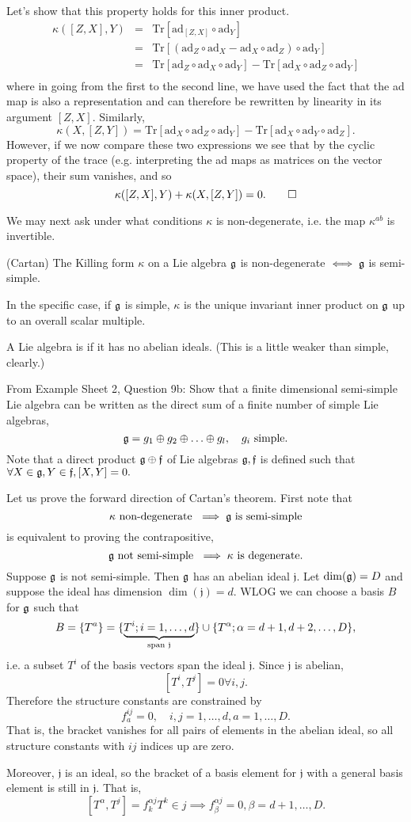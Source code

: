 Let's show that this property holds for this inner product.
\begin{eqnarray*}
\kappa([Z,X],Y) &=&\text{Tr}[\text{ad}_{[Z,X]}\circ \text{ad}_Y]\\
&=&\text{Tr}[(\text{ad}_Z \circ \text{ad}_X - \text{ad}_X \circ \text{ad}_Z)\circ \text{ad}_Y]\\
&=&\text{Tr}[\text{ad}_Z \circ \text{ad}_X \circ \text{ad}_Y] - \text{Tr}[\text{ad}_X \circ \text{ad}_Z \circ \text{ad}_Y]\\
\end{eqnarray*}
where in going from the first to the second line, we have used the fact that the ad map is also a representation and can therefore be rewritten by linearity in its argument $[Z,X]$.
Similarly,
$$\kappa(X,[Z,Y])=\text{Tr}[\text{ad}_X\circ \text{ad}_Z \circ \text{ad}_Y]-\text{Tr}[\text{ad}_X \circ \text{ad}_Y \circ \text{ad}_Z].$$
However, if we now compare these two expressions we see that by the cyclic property of the trace (e.g. interpreting the ad maps as matrices on the vector space), their sum vanishes, and so
$$\kappa([Z,X],Y)+\kappa(X,[Z,Y])=0. \qed$$

We may next ask under what conditions $\kappa$ is non-degenerate, i.e. the map $\kappa^{ab}$ is invertible. 
\begin{thm}
(Cartan) The Killing form $\kappa$ on a Lie algebra $\mathfrak{g}$ is non-degenerate $\iff \mathfrak{g}$ is semi-simple.
\end{thm}
In the specific case, if $\mathfrak{g}$ is simple, $\kappa$ is the unique invariant inner product on $\mathfrak{g}$ up to an overall scalar multiple.
\begin{defn}
A Lie algebra is  if it has no abelian ideals. (This is a little weaker than simple, clearly.)
\end{defn}
\begin{ex}
From Example Sheet 2, Question 9b: Show that a finite dimensional semi-simple Lie algebra can be written as the direct sum of a finite number of simple Lie algebras,
$$\mathfrak{g} = g_1\oplus g_2 \oplus \ldots \oplus g_l, \quad g_i\text{ simple}.$$
Note that a direct product $\mathfrak{g} \oplus \mathfrak{f}$ of Lie algebras $\mathfrak{g},\mathfrak{f}$ is defined such that $\forall X\in \mathfrak{g}, Y \in \mathfrak{f}, [X,Y]=0.$
\end{ex}

Let us prove the forward direction of Cartan's theorem. First note that $$\kappa\text{ non-degenerate }\implies \mathfrak{g}\text{ is semi-simple}$$ is equivalent to proving the contrapositive, 
$$\mathfrak{g}\text{ not semi-simple }\implies \kappa\text{ is degenerate}.$$
Suppose $\mathfrak{g}$ is not semi-simple. Then $\mathfrak{g}$ has an abelian ideal $\mathfrak{j}.$ Let $\dim(\mathfrak{g})=D$ and suppose the ideal has dimension $\dim(\mathfrak{j})=d.$ WLOG we can choose a basis $B$ for $\mathfrak{g}$ such that
$$B=\{T^a\} =\{\underbrace{T^i; i=1,\ldots,d}_{\text{span }\mathfrak{j}}\}\cup \{T^\alpha;\alpha=d+1,d+2,\ldots, D\},$$
i.e. a subset $T^i$ of the basis vectors span the ideal $\mathfrak{j}.$ Since $\mathfrak{j}$ is abelian,
$$[T^i,T^j]=0\forall i,j.$$ Therefore the structure constants are constrained by
$$f^{ij}_a = 0,\quad i,j=1,\ldots, d, a=1,\ldots,D.$$
That is, the bracket vanishes for all pairs of elements in the abelian ideal, so all structure constants with $ij$ indices up are zero.

Moreover, $\mathfrak{j}$ is an ideal, so the bracket of a basis element for $\mathfrak{j}$ with a general basis element is still in $\mathfrak{j}.$ That is,
$$[T^\alpha,T^j]=f^{\alpha j}_k T^k \in j \implies f^{\alpha j}_\beta=0, \beta = d+1,\ldots,D.$$